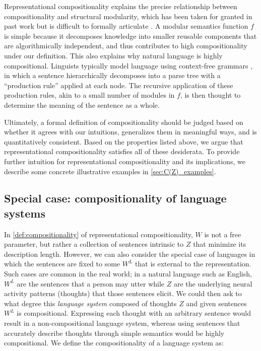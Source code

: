 \documentclass{article} %
\newcommand{\comp}{representational compositionality}
\newcommand{\Comp}{Representational compositionality}
\begin{document}
\Comp{} explains the precise relationship between compositionality and structural modularity, which has been taken for granted in past work but is difficult to formally articulate \citep{lepori2023break,goyal2022inductive,mittal2022modular}. A modular semantics function $f$ is simple because it decomposes knowledge into smaller reusable components that are algorithmically independent, and thus contributes to high compositionality under our definition. This also explains why natural language is highly compositional. Linguists typically model language using context-free grammars \citep{chomsky1956three}, in which a sentence hierarchically decomposes into a parse tree with a ``production rule'' applied at each node. The recursive application of these production rules, akin to a small number of modules in $f$, is then thought to determine the meaning of the sentence as a whole.

Ultimately, a formal definition of compositionality should be judged based on whether it agrees with our intuitions, generalizes them in meaningful ways, and is quantitatively consistent. Based on the properties listed above, we argue that \comp{} satisfies all of these desiderata. To provide further intuition for \comp{} and its implications, we describe some concrete illustrative examples in \cref{sec:C(Z)_examples}.


\subsection{Special case: compositionality of language systems}
\label{sec:language_system}

In \cref{def:compositionality} of \comp{}, $W$ is not a free parameter, but rather a collection of sentences intrinsic to $Z$ that minimize its description length. However, we can also consider the special case of languages in which the sentences are fixed to some $W^L$ that is external to the representation. Such cases are common in the real world; in a natural language such as English, $W^L$ are the sentences that a person may utter while $Z$ are the underlying neural activity patterns (thoughts) that those sentences elicit. We could then ask to what degree this \textit{language system} composed of thoughts $Z$ and given sentences $W^L$ is compositional. Expressing each thought with an arbitrary sentence would result in a non-compositional language system, whereas using sentences that accurately describe thoughts through simple semantics would be highly compositional. We define the compositionality of a language system as:
\end{document}

